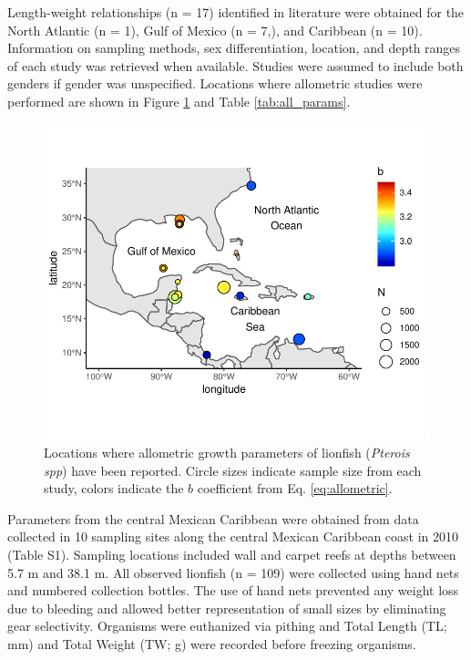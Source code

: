 \documentclass[fleqn,10pt,lineno]{wlpeerj} %
\begin{document}
Length-weight relationships (n = 17) identified in literature were
obtained for the North Atlantic (n = 1), Gulf of Mexico (n = 7,), and
Caribbean (n = 10). Information on sampling methods, sex
differentiation, location, and depth ranges of each study was retrieved
when available. Studies were assumed to include both genders if gender
was unspecified. Locations where allometric studies were performed are
shown in Figure \ref{fig:map} and Table \ref{tab:all_params}.

\begin{figure}
\centering
\includegraphics{Manuscript_files/figure-latex/unnamed-chunk-1-1.pdf}
\caption{\label{fig:map}Locations where allometric growth parameters of
lionfish (\emph{Pterois spp}) have been reported. Circle sizes indicate
sample size from each study, colors indicate the \(b\) coefficient from
Eq. \ref{eq:allometric}.}
\end{figure}

Parameters from the central Mexican Caribbean were obtained from data
collected in 10 sampling sites along the central Mexican Caribbean coast
in 2010 (Table S1). Sampling locations included wall and carpet reefs at
depths between 5.7 m and 38.1 m. All observed lionfish (n = 109) were
collected using hand nets and numbered collection bottles. The use of
hand nets prevented any weight loss due to bleeding and allowed better
representation of small sizes by eliminating gear selectivity. Organisms
were euthanized via pithing and Total Length (TL; mm) and Total Weight
(TW; g) were recorded before freezing organisms.
\end{document}
